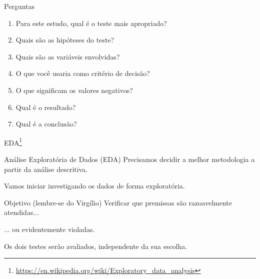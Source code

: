 \documentclass{beamer}
\begin{document}
\begin{frame}[label=perguntas]{\scriptsize Perguntas}
  \begin{enumerate}
    \footnotesize
  \item Para este estudo, qual é o teste mais apropriado?
  \item Quais são as hipóteses do teste?
  \item Quais são as variáveis envolvidas?
  \item O que você usaria como critério de decisão?
  \item O que significam os valores negativos?
  \item Qual é o resultado?
  \item Qual é a conclusão?
  \end{enumerate}
\end{frame}

\begin{frame}{\scriptsize EDA\footnote{\scriptsize \url{https://en.wikipedia.org/wiki/Exploratory_data_analysis}}}
  \begin{block}{Análise Exploratória de Dados (EDA)}
    \footnotesize
    Precisamos decidir a melhor metodologia a partir da análise descritiva.

    \bigskip
    Vamos iniciar investigando os dados de forma exploratória.
  \end{block}
  \vfill
  \begin{block}{Objetivo (lembre-se do Virgílio)}
    Verificar que premissas são razoavelmente atendidas...

    \bigskip
    ... ou evidentemente violadas.
  \end{block}
\end{frame}

\begin{frame}{\scriptsize }
  \begin{center}
    {\LARGE

      Os dois testes serão avaliados, independente da sua escolha.

    }
  \end{center}
  \vfill
\end{frame}
\end{document}
